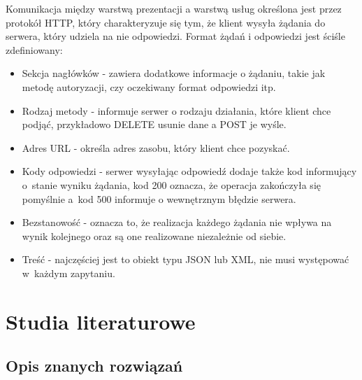 Komunikacja między warstwą prezentacji a warstwą usług określona jest przez protokół HTTP, który charakteryzuje się tym, że klient wysyła żądania do serwera, który udziela na nie odpowiedzi. Format żądań i odpowiedzi jest ściśle zdefiniowany:
\begin{itemize}
\item Sekcja nagłówków - zawiera dodatkowe informacje o żądaniu, takie jak metodę autoryzacji, czy oczekiwany format odpowiedzi itp.
\item Rodzaj metody - informuje serwer o rodzaju działania, które klient chce podjąć, przykładowo DELETE usunie dane a POST je wyśle.
\item Adres URL - określa adres zasobu, który klient chce pozyskać.
\item Kody odpowiedzi - serwer wysyłając odpowiedź dodaje także kod informujący o~stanie wyniku żądania, kod 200 oznacza, że operacja zakończyła się pomyślnie a~kod 500 informuje o wewnętrznym błędzie serwera.
\item Bezstanowość - oznacza to, że realizacja każdego żądania nie wpływa na wynik kolejnego oraz są one realizowane niezależnie od siebie.
\item Treść - najczęściej jest to obiekt typu JSON lub XML, nie musi występować w~każdym zapytaniu.
\end{itemize}


\section{Studia literaturowe}

\subsection{Opis znanych rozwiązań}

